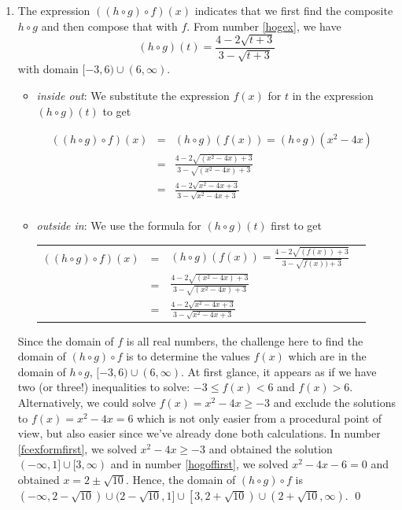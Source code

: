 \documentclass{ximera}
\begin{document}
\begin{example}
\begin{explanation}
\begin{enumerate}
\item  The expression $((h \circ g) \circ f)(x)$ indicates that we first find the composite $h \circ g$ and then compose that with $f$.  From number \ref{hogex}, we have \[(h \circ g)(t) = \frac{4-2\sqrt{t+3}}{3-\sqrt{t+3}}\]  with domain $[-3, 6) \cup (6, \infty)$.
\begin{itemize}

\item  \textit{inside out}: We substitute the expression $f(x)$ for $t$ in the expression $(h \circ g)(t)$ to get 

\[ \begin{array}{rclr}
((h \circ g) \circ f)(x) & = & (h \circ g)(f(x)) = (h \circ g)\left(x^2-4x\right) & \\  
                         & = & \frac{4-2\sqrt{\left(x^2-4x\right)+3}}{3-\sqrt{\left(x^2-4x\right)+3}} & \\  
                         & = & \frac{4 - 2\sqrt{x^2-4x+3}}{3 - \sqrt{x^2-4x+3}} & \\ \end{array}\]

\item  \textit{outside in}:  We use the formula for $(h \circ g)(t)$ first to get
\begin{longtable}{rclr} $((h \circ g) \circ f)(x)$ & = & $(h \circ g)(f(x))=\frac{4-2\sqrt{(f(x))+3}}{3-\sqrt{f(x))+3}}$  & \\  
  & = & $\frac{4 - 2\sqrt{\left(x^2-4x\right)+3}}{3 - \sqrt{\left(x^2-4x\right)+3}}$ & \\ 
 & = & $\frac{4 - 2\sqrt{x^2-4x+3}}{3 - \sqrt{x^2-4x+3}}$ & \\
 \end{longtable}
 
 \end{itemize}

Since the domain of $f$ is all real numbers, the challenge here to find the domain of $(h \circ g) \circ f$ is to determine the values $f(x)$ which are in the domain of  $h \circ g$,  $[-3, 6) \cup (6, \infty)$.  At first glance, it appears as if we have two (or three!) inequalities to solve:  $-3 \leq f(x) < 6$ and $f(x) > 6$.  Alternatively, we could solve $f(x) = x^2-4x \geq -3$ and exclude the solutions to $f(x) = x^2-4x = 6$ which is not only easier from a procedural point of view, but also easier since we've already done both calculations.   In number \ref{fcexformfirst}, we solved  $x^2-4x \geq -3$ and obtained the solution $(-\infty, 1] \cup [3, \infty)$ and in number \ref{hogoffirst}, we solved $x^2-4x-6 = 0$ and obtained $x = 2 \pm \sqrt{10}$.  Hence, the domain of $(h \circ g) \circ f$ is  $(-\infty, 2 -\sqrt{10}) \cup (2 - \sqrt{10}, 1] \cup \left[3, 2 + \sqrt{10}\right) \cup \left(2+\sqrt{10}, \infty\right)$. \qed

\end{enumerate}
\end{explanation}

\label{functioncompex1}
\end{example}
\end{document}
